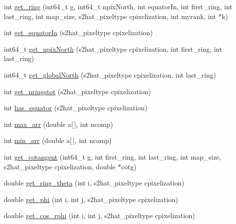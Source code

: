 \begin{DoxyCompactItemize}
\item 
int \hyperlink{rng_2common_2lensing__sub_8c_a515ce6e32c83cc252ce2d98da4b8f6d0}{get\-\_\-ring} (int64\-\_\-t g, int64\-\_\-t npix\-North, int equator\-In, int first\-\_\-ring, int last\-\_\-ring, int map\-\_\-size, s2hat\-\_\-pixeltype cpixelization, int myrank, int $\ast$k)
\item 
int \hyperlink{rng_2common_2lensing__sub_8c_a2a1743bd0178c238e91c0d0aa24f729a}{get\-\_\-equator\-In} (s2hat\-\_\-pixeltype cpixelization)
\item 
int64\-\_\-t \hyperlink{rng_2common_2lensing__sub_8c_a45d7e65d95505e97ab8cbd4284a46e01}{get\-\_\-npix\-North} (s2hat\-\_\-pixeltype cpixelization, int first\-\_\-ring, int last\-\_\-ring)
\item 
int64\-\_\-t \hyperlink{rng_2common_2lensing__sub_8c_a3388dbe63d1f41c902347aca0b7853f1}{get\-\_\-global\-North} (s2hat\-\_\-pixeltype cpixelization, int last\-\_\-ring)
\item 
int \hyperlink{rng_2common_2lensing__sub_8c_ac7fdfc1b6293b5643848a0ba0f9bf0ff}{get\-\_\-nringstot} (s2hat\-\_\-pixeltype cpixelization)
\item 
int \hyperlink{rng_2common_2lensing__sub_8c_a9dffeb44e209a3ef04a84e4a25f041e6}{has\-\_\-equator} (s2hat\-\_\-pixeltype cpixelization)
\item 
int \hyperlink{rng_2common_2lensing__sub_8c_a19e2918b377bd820f3a20dee06b88de2}{max\-\_\-arr} (double a\mbox{[}$\,$\mbox{]}, int ncomp)
\item 
int \hyperlink{rng_2common_2lensing__sub_8c_a3f0449ae9cbd5c0005db6d26da882085}{min\-\_\-arr} (double a\mbox{[}$\,$\mbox{]}, int ncomp)
\item 
int \hyperlink{rng_2common_2lensing__sub_8c_adfd4526ab7b84ab4063eafa3aff125f5}{get\-\_\-cotangent} (int64\-\_\-t g, int first\-\_\-ring, int last\-\_\-ring, int map\-\_\-size, s2hat\-\_\-pixeltype cpixelization, double $\ast$cotg)
\item 
double \hyperlink{rng_2common_2lensing__sub_8c_a01cfb565f05ca0574ffe427957766e22}{get\-\_\-ring\-\_\-theta} (int i, s2hat\-\_\-pixeltype cpixelization)
\item 
double \hyperlink{rng_2common_2lensing__sub_8c_a8b0d92bd46d564b7cb02a352506cd8d1}{get\-\_\-phi} (int i, int j, s2hat\-\_\-pixeltype cpixelization)
\item 
double \hyperlink{rng_2common_2lensing__sub_8c_ade4546fa40d7a7fb7f0e9e8e7ac745df}{get\-\_\-cos\-\_\-rphi} (int i, int j, s2hat\-\_\-pixeltype cpixelization)

\end{DoxyCompactItemize}
